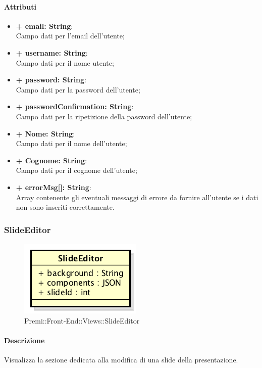 	\paragraph{Attributi}
	\begin{itemize}
		\item \textbf{+ email: String}:\\
			Campo dati per l'email dell'utente;
		\item \textbf{+ username: String}:\\
			Campo dati per il nome utente;
		\item \textbf{+ password: String}:\\
			Campo dati per la password dell'utente;
		\item \textbf{+ passwordConfirmation: String}:\\
			Campo dati per la ripetizione della password dell'utente;
		\item \textbf{+ Nome: String}:\\
			Campo dati per il nome dell'utente;
		\item \textbf{+ Cognome: String}:\\
			Campo dati per il cognome dell'utente;		
		\item \textbf{+ errorMsg[]: String}:\\
			Array contenente gli eventuali messaggi di errore da fornire all'utente se i dati non sono inseriti correttamente.
	\end{itemize}
\newpage
	
	
\subsubsection{SlideEditor}
	\begin{figure}[h]
		\centering
		\includegraphics[width=0.3\linewidth]{img/premi_front_end_views_slideeditor}
		\caption[Premi::Front-End::Views::SlideEditor]{Premi::Front-End::Views::SlideEditor}
	\end{figure}
	
	\paragraph{Descrizione}
	Visualizza la sezione dedicata alla modifica di una slide della presentazione.
	
